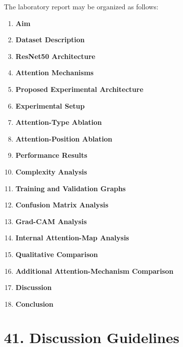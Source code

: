 \documentclass[10pt]{article}
\begin{document}
The laboratory report may be organized as follows:

\begin{enumerate}

\item \textbf{Aim}

\item \textbf{Dataset Description}

\item \textbf{ResNet50 Architecture}

\item \textbf{Attention Mechanisms}

\item \textbf{Proposed Experimental Architecture}

\item \textbf{Experimental Setup}

\item \textbf{Attention-Type Ablation}

\item \textbf{Attention-Position Ablation}

\item \textbf{Performance Results}

\item \textbf{Complexity Analysis}

\item \textbf{Training and Validation Graphs}

\item \textbf{Confusion Matrix Analysis}

\item \textbf{Grad-CAM Analysis}

\item \textbf{Internal Attention-Map Analysis}

\item \textbf{Qualitative Comparison}

\item \textbf{Additional Attention-Mechanism Comparison}

\item \textbf{Discussion}

\item \textbf{Conclusion}

\end{enumerate}

\section*{41. Discussion Guidelines}
\end{document}
